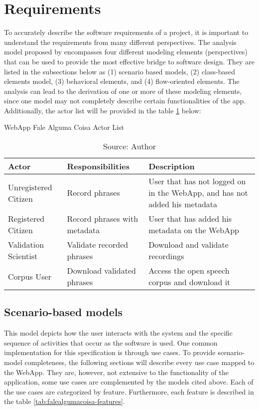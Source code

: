 \section{Requirements}

To accurately describe the software requirements of a project, it is important to understand the requirements from many different perspectives. The analysis model proposed by \cite{pressman2014software} encompasses four different modeling elements (perspectives) that can be used to provide the most effective bridge to software design. They are listed in the subsections below as (1) scenario based models, (2) class-based elements model, (3) behavioral elements, and (4) flow-oriented elements. The analysis can lead to the derivation of one or more of these modeling elements, since one model may not completely describe certain functionalities of the app. Additionally, the actor list will be provided in the table \ref{tab:actor-list} below:

\begin{table}[h]
\centering
\caption{WebApp Fale Alguma Coisa Actor List}
\label{tab:actor-list}
\begin{tabular}{|p{2.5cm}|p{3.5cm}|p{7cm}|}
    \hline 
    Actor & Responsibilities & Description  \\ \hline
    Unregistered Citizen & Record phrases & User that has not logged on in the WebApp, and has not added his metadata \\ \hline
    Registered Citizen & Record phrases with metadata & User that has added his metadata on the WebApp \\ \hline 
    Validation Scientist & Validate recorded phrases & Download and validate recordings \\ \hline
    Corpus User & Download validated phrases & Access the open speech corpus and download it \\ \hline
\end{tabular}
\caption*{Source: Author}
\end{table}

\subsection{Scenario-based models}

This model depicts how the user interacts with the system and the specific sequence of activities that occur as the software is used. One common implementation for this specification is through use cases. To provide scenario-model completeness, the following sections will describe every use case mapped to the WebApp. They are, however, not extensive to the functionality of the application, some use cases are complemented by the models cited above. Each of the use cases are categorized by feature. Furthermore, each feature is described in the table \ref{tab:falealgumacoisa-features}.

